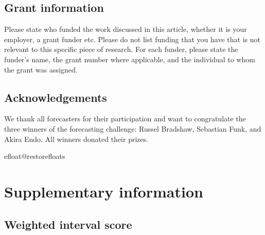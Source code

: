\documentclass[10pt,a4paper,twocolumn]{article}
\begin{document}
\subsection*{Grant information}
Please state who funded the work discussed in this article, whether it is your employer,
a grant funder etc. Please do not list funding that you have that is not relevant to this
specific piece of research. For each funder, please state the funder’s name, the grant
number where applicable, and the individual to whom the grant was assigned.

\subsection*{Acknowledgements}
We thank all forecasters for their participation and want to congratulate the three winners of the forecasting challenge: Russel Bradshaw, Sebastian Funk, and Akira Endo. All winners donated their prizes. 



\clearpage

{\small
}

\bigskip
\clearpage


\processdelayedfloats
\csname efloat@restorefloats\endcsname

\appendix
\section*{Supplementary information}
\renewcommand{\thefigure}{SI.\arabic{figure}}
\setcounter{figure}{0}
\renewcommand{\thetable}{SI.\arabic{table}} \setcounter{table}{0}


\subsection*{Weighted interval score}
\label{sec:wis}
\end{document}

